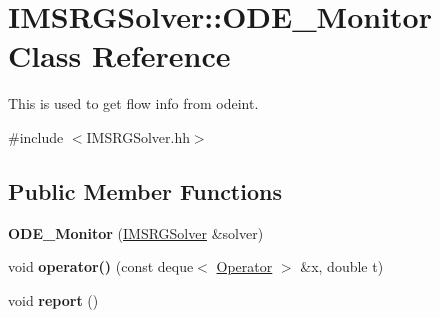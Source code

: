 \hypertarget{classIMSRGSolver_1_1ODE__Monitor}{}\section{I\+M\+S\+R\+G\+Solver\+:\+:O\+D\+E\+\_\+\+Monitor Class Reference}
\label{classIMSRGSolver_1_1ODE__Monitor}


This is used to get flow info from odeint.  




{\ttfamily \#include $<$I\+M\+S\+R\+G\+Solver.\+hh$>$}

\subsection*{Public Member Functions}
\begin{DoxyCompactItemize}
\item 
\mbox{\label{classIMSRGSolver_1_1ODE__Monitor_a10240816aa206dcdf51f03dbfb099926}} 
{\bfseries O\+D\+E\+\_\+\+Monitor} (\hyperlink{classIMSRGSolver}{I\+M\+S\+R\+G\+Solver} \&solver)
\item 
\mbox{\label{classIMSRGSolver_1_1ODE__Monitor_af0fd2cf0accd4ee44a389c6f6bc3c3fa}} 
void {\bfseries operator()} (const deque$<$ \hyperlink{classOperator}{Operator} $>$ \&x, double t)
\item 
\mbox{\label{classIMSRGSolver_1_1ODE__Monitor_adb9440f26a3034643600f980a63ea895}} 
void {\bfseries report} ()
\end{DoxyCompactItemize}
